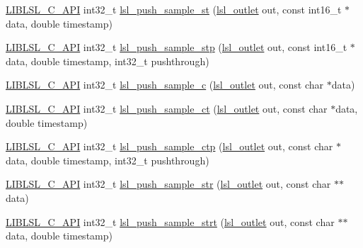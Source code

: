 \begin{DoxyCompactItemize}
\item 
\hyperlink{lsl__cpp_8h_aafd0ef1813e8be84a1420c4f1df64615}{L\+I\+B\+L\+S\+L\+\_\+\+C\+\_\+\+A\+PI} int32\+\_\+t \hyperlink{namespacelsl_a9a22e090bfa2e61ec19d70dc9bb5908d}{lsl\+\_\+push\+\_\+sample\+\_\+st} (\hyperlink{namespacelsl_abcf512b0f66dacf86c10b165995fd50b}{lsl\+\_\+outlet} out, const int16\+\_\+t $\ast$data, double timestamp)
\item 
\hyperlink{lsl__cpp_8h_aafd0ef1813e8be84a1420c4f1df64615}{L\+I\+B\+L\+S\+L\+\_\+\+C\+\_\+\+A\+PI} int32\+\_\+t \hyperlink{namespacelsl_a916ebe3afa6e7b83d670211c7320df51}{lsl\+\_\+push\+\_\+sample\+\_\+stp} (\hyperlink{namespacelsl_abcf512b0f66dacf86c10b165995fd50b}{lsl\+\_\+outlet} out, const int16\+\_\+t $\ast$data, double timestamp, int32\+\_\+t pushthrough)
\item 
\hyperlink{lsl__cpp_8h_aafd0ef1813e8be84a1420c4f1df64615}{L\+I\+B\+L\+S\+L\+\_\+\+C\+\_\+\+A\+PI} int32\+\_\+t \hyperlink{namespacelsl_aff896f8925d3453857deabc1f9cfd24a}{lsl\+\_\+push\+\_\+sample\+\_\+c} (\hyperlink{namespacelsl_abcf512b0f66dacf86c10b165995fd50b}{lsl\+\_\+outlet} out, const char $\ast$data)
\item 
\hyperlink{lsl__cpp_8h_aafd0ef1813e8be84a1420c4f1df64615}{L\+I\+B\+L\+S\+L\+\_\+\+C\+\_\+\+A\+PI} int32\+\_\+t \hyperlink{namespacelsl_a321429ed29e2b8b944f7724361628ba9}{lsl\+\_\+push\+\_\+sample\+\_\+ct} (\hyperlink{namespacelsl_abcf512b0f66dacf86c10b165995fd50b}{lsl\+\_\+outlet} out, const char $\ast$data, double timestamp)
\item 
\hyperlink{lsl__cpp_8h_aafd0ef1813e8be84a1420c4f1df64615}{L\+I\+B\+L\+S\+L\+\_\+\+C\+\_\+\+A\+PI} int32\+\_\+t \hyperlink{namespacelsl_a7127acf0d2106d5ae673489510845f58}{lsl\+\_\+push\+\_\+sample\+\_\+ctp} (\hyperlink{namespacelsl_abcf512b0f66dacf86c10b165995fd50b}{lsl\+\_\+outlet} out, const char $\ast$data, double timestamp, int32\+\_\+t pushthrough)
\item 
\hyperlink{lsl__cpp_8h_aafd0ef1813e8be84a1420c4f1df64615}{L\+I\+B\+L\+S\+L\+\_\+\+C\+\_\+\+A\+PI} int32\+\_\+t \hyperlink{namespacelsl_a3da2b3303768776977e0d621e2990c0e}{lsl\+\_\+push\+\_\+sample\+\_\+str} (\hyperlink{namespacelsl_abcf512b0f66dacf86c10b165995fd50b}{lsl\+\_\+outlet} out, const char $\ast$$\ast$data)
\item 
\hyperlink{lsl__cpp_8h_aafd0ef1813e8be84a1420c4f1df64615}{L\+I\+B\+L\+S\+L\+\_\+\+C\+\_\+\+A\+PI} int32\+\_\+t \hyperlink{namespacelsl_a634f8191b28e9cb9b6edcf01aaead377}{lsl\+\_\+push\+\_\+sample\+\_\+strt} (\hyperlink{namespacelsl_abcf512b0f66dacf86c10b165995fd50b}{lsl\+\_\+outlet} out, const char $\ast$$\ast$data, double timestamp)

\end{DoxyCompactItemize}
